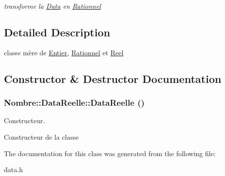 \begin{DoxyCompactItemize}
\begin{DoxyCompactList}\small\item\em transforme la \hyperlink{classNombre_1_1Data}{Data} en \hyperlink{classNombre_1_1Rationnel}{Rationnel} \item\end{DoxyCompactList}\end{DoxyCompactItemize}


\subsection{Detailed Description}
classe mère de \hyperlink{classNombre_1_1Entier}{Entier}, \hyperlink{classNombre_1_1Rationnel}{Rationnel} et \hyperlink{classNombre_1_1Reel}{Reel} 

\subsection{Constructor \& Destructor Documentation}
\hypertarget{classNombre_1_1DataReelle_a3360b818a88c03f35499c1cd8cdb614b}{
\subsubsection[{DataReelle}]{\setlength{\rightskip}{0pt plus 5cm}Nombre::DataReelle::DataReelle ()}}
\label{classNombre_1_1DataReelle_a3360b818a88c03f35499c1cd8cdb614b}


Constructeur. 

Constructeur de la classe 

The documentation for this class was generated from the following file:\begin{DoxyCompactItemize}
\item 
data.h\end{DoxyCompactItemize}
